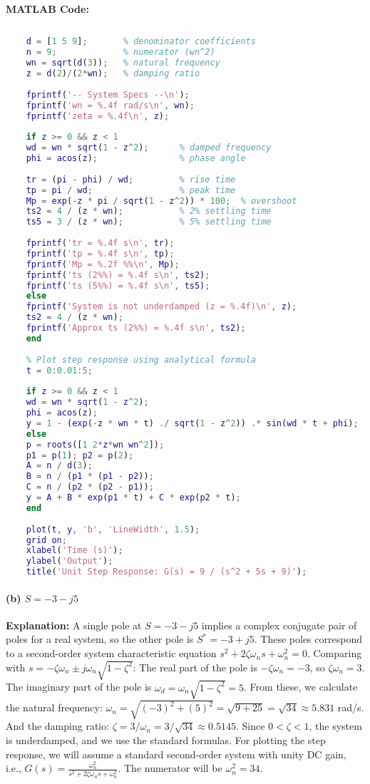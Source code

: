 \documentclass{article}
\begin{document}
	\textbf{MATLAB Code:}
\begin{lstlisting}[language=Matlab, caption=Simplified MATLAB Code for Problem 1(a)]
	% G(s) = 9 / (s^2 + 5s + 9)
	
	d = [1 5 9];       % denominator coefficients
	n = 9;             % numerator (wn^2)
	wn = sqrt(d(3));   % natural frequency
	z = d(2)/(2*wn);   % damping ratio
	
	fprintf('-- System Specs --\n');
	fprintf('wn = %.4f rad/s\n', wn);
	fprintf('zeta = %.4f\n', z);
	
	if z >= 0 && z < 1
	wd = wn * sqrt(1 - z^2);      % damped frequency
	phi = acos(z);                % phase angle
	
	tr = (pi - phi) / wd;         % rise time
	tp = pi / wd;                 % peak time
	Mp = exp(-z * pi / sqrt(1 - z^2)) * 100;  % overshoot
	ts2 = 4 / (z * wn);           % 2% settling time
	ts5 = 3 / (z * wn);           % 5% settling time
	
	fprintf('tr = %.4f s\n', tr);
	fprintf('tp = %.4f s\n', tp);
	fprintf('Mp = %.2f %%\n', Mp);
	fprintf('ts (2%%) = %.4f s\n', ts2);
	fprintf('ts (5%%) = %.4f s\n', ts5);
	else
	fprintf('System is not underdamped (z = %.4f)\n', z);
	ts2 = 4 / (z * wn);
	fprintf('Approx ts (2%%) = %.4f s\n', ts2);
	end
	
	% Plot step response using analytical formula
	t = 0:0.01:5;
	
	if z >= 0 && z < 1
	wd = wn * sqrt(1 - z^2);
	phi = acos(z);
	y = 1 - (exp(-z * wn * t) ./ sqrt(1 - z^2)) .* sin(wd * t + phi);
	else
	p = roots([1 2*z*wn wn^2]);
	p1 = p(1); p2 = p(2);
	A = n / d(3);
	B = n / (p1 * (p1 - p2));
	C = n / (p2 * (p2 - p1));
	y = A + B * exp(p1 * t) + C * exp(p2 * t);
	end
	
	plot(t, y, 'b', 'LineWidth', 1.5);
	grid on;
	xlabel('Time (s)');
	ylabel('Output');
	title('Unit Step Response: G(s) = 9 / (s^2 + 5s + 9)');
\end{lstlisting}

	
	\paragraph{(b) $S = -3 - j5$}
	\textbf{Explanation:}
	A single pole at $S = -3 - j5$ implies a complex conjugate pair of poles for a real system, so the other pole is $S^* = -3 + j5$.
	These poles correspond to a second-order system characteristic equation $s^2 + 2\zeta\omega_n s + \omega_n^2 = 0$.
	Comparing with $s = -\zeta\omega_n \pm j\omega_n\sqrt{1-\zeta^2}$:
	The real part of the pole is $-\zeta\omega_n = -3$, so $\zeta\omega_n = 3$.
	The imaginary part of the pole is $\omega_d = \omega_n\sqrt{1-\zeta^2} = 5$.
	From these, we calculate the natural frequency: $\omega_n = \sqrt{(-3)^2 + (5)^2} = \sqrt{9 + 25} = \sqrt{34} \approx 5.831$ rad/s.
	And the damping ratio: $\zeta = 3/\omega_n = 3/\sqrt{34} \approx 0.5145$.
	Since $0 < \zeta < 1$, the system is underdamped, and we use the standard formulas.
	For plotting the step response, we will assume a standard second-order system with unity DC gain, i.e., $G(s) = \frac{\omega_n^2}{s^2 + 2\zeta\omega_n s + \omega_n^2}$. The numerator will be $\omega_n^2 = 34$.
	
\end{document}
